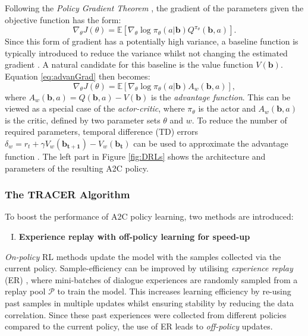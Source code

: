 \documentclass[11pt,a4paper]{article}
\begin{document}
Following the {\it Policy Gradient Theorem} \cite{sutton1999policy}, the gradient of the parameters given the objective function has the  form: 
\begin{equation} \label{eq:advanGrad}
\nabla_\theta J(\theta) = \mathbb{E} \left[ \nabla_\theta \log \pi_{\theta}(a|\mathbf{b})Q^{\pi_{\theta}}(\mathbf{b},a) \right].
\end{equation}
Since this form of gradient has a potentially high variance,
a baseline function is typically introduced to reduce the variance whilst not changing the estimated gradient \cite{williams1992simple,RL}. A natural candidate for this baseline is the value function $V(\mathbf{b})$. Equation \ref{eq:advanGrad} then becomes:
\begin{equation} \label{eq:advanGrad}
\nabla_\theta J(\theta) = \mathbb{E} \left[ \nabla_\theta \log \pi_{\theta}(a|\mathbf{b})A_w(\mathbf{b},a) \right],
\end{equation}
where $A_w(\mathbf{b},a) = Q(\mathbf{b},a) - V(\mathbf{b})$  is the {\it advantage function}. 
This can be viewed as a special case of the {\it actor-critic}, where $\pi_{\theta}$ is the actor and $A_w(\mathbf{b},a)$ is the critic, defined by two parameter sets $\theta$ and $w$. 
To reduce the number of required parameters, temporal difference (TD) errors $\delta_w = r_{t} + \gamma V_w(\mathbf{b_{t+1}}) - V_w(\mathbf{b_t})$ can be used to approximate the advantage function
\cite{schulman2015high}. The left part in Figure \ref{fig:DRLs} shows the architecture and parameters of the resulting A2C policy.

\subsubsection{The TRACER Algorithm}
\label{sec:stabilising}

To boost the performance of A2C policy learning, two methods are introduced:
\begin{enumerate}[I.]
\item {\bf Experience replay with off-policy learning for speed-up}
\end{enumerate}

{\it On-policy} RL methods update the model with the samples collected via the current policy. 
Sample-efficiency can be improved by utilising {\it experience replay} (ER) \cite{lin1992self}, where mini-batches of dialogue experiences are randomly sampled from a replay pool $\mathcal{P}$ to train the model.
This increases learning efficiency by re-using past samples in multiple updates whilst ensuring stability by reducing the data correlation.
Since these past experiences were collected from different policies compared to the current policy, the use of ER leads to {\it off-policy} updates.
\end{document}
